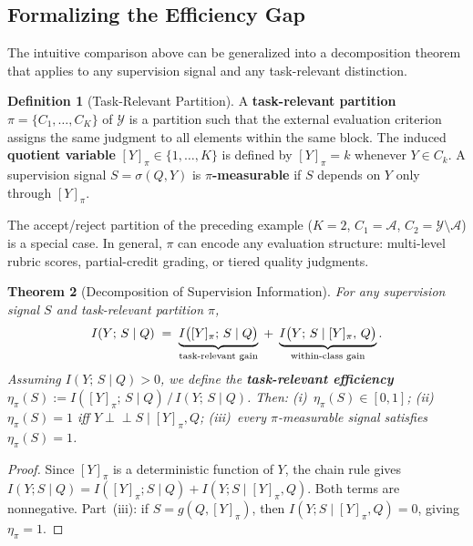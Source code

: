 \documentclass{article}
\theoremstyle{plain}
\newtheorem{theorem}{Theorem}[section]
\theoremstyle{definition}
\newtheorem{definition}[theorem]{Definition}
\theoremstyle{remark}
\begin{document}
\subsection{Formalizing the Efficiency Gap}

The intuitive comparison above can be generalized into a decomposition theorem that applies to any supervision signal and any task-relevant distinction.

\begin{definition}[Task-Relevant Partition]
\label{def:partition}
A \textbf{task-relevant partition} $\pi=\{C_1,\dots,C_K\}$ of $\mathcal{Y}$ is a partition such that the external evaluation criterion assigns the same judgment to all elements within the same block. The induced \textbf{quotient variable} $[Y]_\pi\in\{1,\dots,K\}$ is defined by $[Y]_\pi=k$ whenever $Y\in C_k$. A supervision signal $S=\sigma(Q,Y)$ is \textbf{$\pi$-measurable} if $S$ depends on $Y$ only through $[Y]_\pi$.
\end{definition}

The accept/reject partition of the preceding example ($K=2$, $C_1=\mathcal{A}$, $C_2=\mathcal{Y}\setminus\mathcal{A}$) is a special case. In general, $\pi$ can encode any evaluation structure: multi-level rubric scores, partial-credit grading, or tiered quality judgments.

\begin{theorem}[Decomposition of Supervision Information]
\label{thm:decomp}
For any supervision signal $S$ and task-relevant partition $\pi$,
\begin{equation}
\label{eq:decomp}
  I(Y;\,S\mid Q)
  \;=\;\underbrace{I\bigl([Y]_\pi;\,S\mid Q\bigr)}_{\textup{task-relevant gain}}
  \;+\;\underbrace{I\bigl(Y;\,S\mid [Y]_\pi,\,Q\bigr)}_{\textup{within-class gain}}.
\end{equation}
Assuming $I(Y;\,S\mid Q)>0$, we define the \textbf{task-relevant efficiency} $\eta_\pi(S):= I([Y]_\pi;\,S\mid Q)\,/\,I(Y;\,S\mid Q)$. Then: \textup{(i)}~$\eta_\pi(S)\in[0,1]$; \textup{(ii)}~$\eta_\pi(S)=1$ iff $Y\perp\!\!\!\perp S\mid [Y]_\pi,Q$; \textup{(iii)}~every $\pi$-measurable signal satisfies $\eta_\pi(S)=1$.
\end{theorem}

\begin{proof}
Since $[Y]_\pi$ is a deterministic function of $Y$, the chain rule gives $I(Y;S\mid Q)=I([Y]_\pi;S\mid Q)+I(Y;S\mid [Y]_\pi,Q)$. Both terms are nonneg\-ative. Part~(iii): if $S=g(Q,[Y]_\pi)$, then $I(Y;S\mid [Y]_\pi,Q)=0$, giving $\eta_\pi=1$.
\end{proof}
\end{document}
